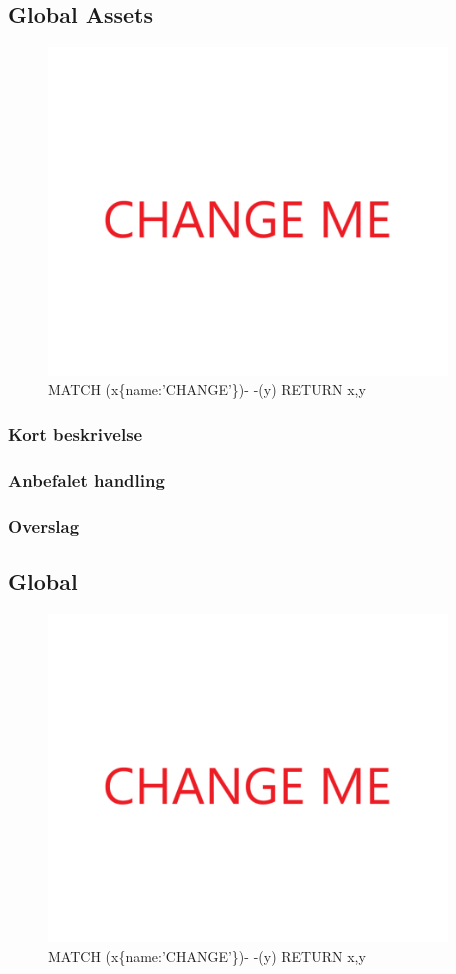 \documentclass{article}
\begin{document}
\subsection{Global Assets}
\begin{figure}[h]
\includegraphics[width=300pt]{CHANGE.PNG}
\caption{MATCH (x\{name:'CHANGE'\})- -(y) RETURN x,y}
\end{figure}
\subsubsection{Kort beskrivelse}
\subsubsection{Anbefalet handling}
\subsubsection{Overslag}
\subsection{Global}
\begin{figure}[h]
\includegraphics[width=300pt]{CHANGE.PNG}
\caption{MATCH (x\{name:'CHANGE'\})- -(y) RETURN x,y}
\end{figure}
\end{document}
